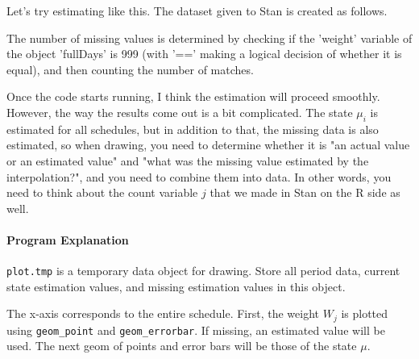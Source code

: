 \documentclass{ltjsbook}
\begin{document}


Let's try estimating like this. The dataset given to Stan is created as follows.

The number of missing values is determined by checking if the 'weight' variable of the object 'fullDays' is 999 (with '==' making a logical decision of whether it is equal), and then counting the number of matches.

Once the code starts running, I think the estimation will proceed smoothly. However, the way the results come out is a bit complicated. The state $\mu_i$ is estimated for all schedules, but in addition to that, the missing data is also estimated, so when drawing, you need to determine whether it is "an actual value or an estimated value" and "what was the missing value estimated by the interpolation?", and you need to combine them into data. In other words, you need to think about the count variable $j$ that we made in Stan on the R side as well.

\paragraph{Program Explanation}

\item [Receiving the results of the function] \verb|plot.tmp| is a temporary data object for drawing. Store all period data, current state estimation values, and missing estimation values in this object.
\item[Plotting] The x-axis corresponds to the entire schedule. First, the weight $W_j$ is plotted using \verb|geom_point| and \verb|geom_errorbar|. If missing, an estimated value will be used. The next geom of points and error bars will be those of the state $\mu$.
\end{document}
